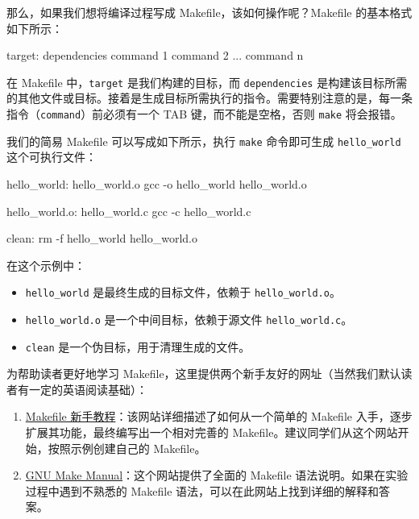 
那么，如果我们想将编译过程写成 Makefile，该如何操作呢？Makefile 的基本格式如下所示：

\begin{CodeBlock}[language=BookMake]
target: dependencies
	command 1
	command 2
	...
	command n
\end{CodeBlock}

在 Makefile 中，\texttt{target} 是我们构建的目标，而 \texttt{dependencies} 是构建该目标所需的其他文件或目标。接着是生成目标所需执行的指令。需要特别注意的是，每一条指令（\texttt{command}）前必须有一个 TAB 键，而不能是空格，否则 \texttt{make} 将会报错。

我们的简易 Makefile 可以写成如下所示，执行 \texttt{make} 命令即可生成 \texttt{hello\_world} 这个可执行文件：

\begin{CodeBlock}[language=BookMake]
hello_world: hello_world.o
	gcc -o hello_world hello_world.o

hello_world.o: hello_world.c
	gcc -c hello_world.c

clean:
	rm -f hello_world hello_world.o
\end{CodeBlock}

在这个示例中：

\begin{itemize}
\tightlist
\item
  \texttt{hello\_world} 是最终生成的目标文件，依赖于 \texttt{hello\_world.o}。
\item
  \texttt{hello\_world.o} 是一个中间目标，依赖于源文件 \texttt{hello\_world.c}。
\item
  \texttt{clean} 是一个伪目标，用于清理生成的文件。
\end{itemize}

为帮助读者更好地学习 Makefile，这里提供两个新手友好的网址（当然我们默认读者有一定的英语阅读基础）：

\begin{enumerate}
\def\labelenumi{\arabic{enumi}.}
\item
  \href{http://www.cs.colby.edu/maxwell/courses/tutorials/maketutor}{Makefile 新手教程}：该网站详细描述了如何从一个简单的 Makefile 入手，逐步扩展其功能，最终编写出一个相对完善的 Makefile。建议同学们从这个网站开始，按照示例创建自己的 Makefile。
\item
  \href{http://www.gnu.org/software/make/manual/make.html\#Reading-Makefiles}{GNU Make Manual}：这个网站提供了全面的 Makefile 语法说明。如果在实验过程中遇到不熟悉的 Makefile 语法，可以在此网站上找到详细的解释和答案。
\end{enumerate}

